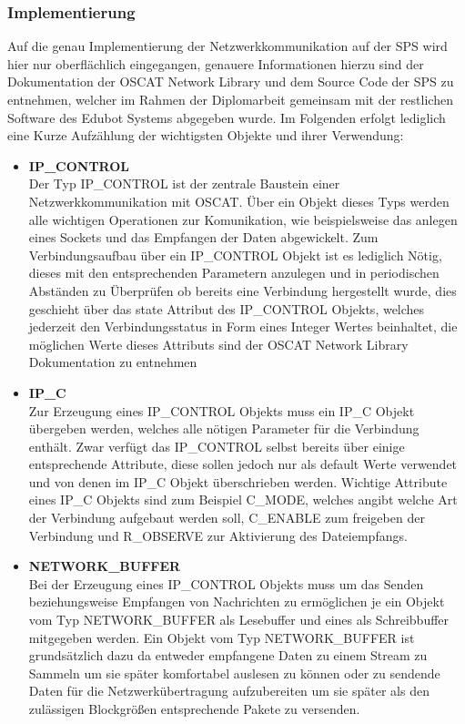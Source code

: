 \subsubsection{Implementierung}
Auf die genau Implementierung der Netzwerkkommunikation auf der SPS wird hier nur oberflächlich eingegangen, genauere Informationen hierzu sind der Dokumentation der OSCAT Network Library und dem Source Code der SPS zu entnehmen, welcher im Rahmen der Diplomarbeit gemeinsam mit der restlichen Software des Edubot Systems abgegeben wurde. Im Folgenden erfolgt lediglich eine Kurze Aufzählung der wichtigsten Objekte und ihrer Verwendung:
\begin{itemize}
\item \textbf{IP\_CONTROL}\\
Der Typ IP\_CONTROL ist der zentrale Baustein einer Netzwerkkommunikation mit OSCAT. Über ein Objekt dieses Typs werden alle wichtigen Operationen zur Komunikation, wie beispielsweise das anlegen eines Sockets und das Empfangen der Daten abgewickelt. Zum Verbindungsaufbau über ein IP\_CONTROL Objekt ist es lediglich Nötig, dieses mit den entsprechenden Parametern anzulegen und in periodischen Abständen zu Überprüfen ob bereits eine Verbindung hergestellt wurde, dies geschieht über das state Attribut des IP\_CONTROL Objekts, welches jederzeit den Verbindungsstatus in Form eines Integer Wertes beinhaltet, die möglichen Werte dieses Attributs sind der OSCAT Network Library Dokumentation zu entnehmen

\item \textbf{IP\_C}\\
Zur Erzeugung eines IP\_CONTROL Objekts muss ein IP\_C Objekt übergeben werden, welches alle nötigen Parameter für die Verbindung enthält. Zwar verfügt das IP\_CONTROL selbst bereits über einige entsprechende Attribute, diese sollen jedoch nur als default Werte verwendet und von denen im IP\_C Objekt überschrieben werden. 
Wichtige Attribute eines IP\_C Objekts sind zum Beispiel C\_MODE, welches angibt welche Art der Verbindung aufgebaut werden soll, C\_ENABLE zum freigeben der Verbindung und R\_OBSERVE zur Aktivierung des Dateiempfangs.

\item \textbf{NETWORK\_BUFFER}\\
Bei der Erzeugung eines IP\_CONTROL Objekts muss um das Senden beziehungsweise Empfangen von Nachrichten zu ermöglichen je ein Objekt vom Typ NETWORK\_BUFFER als Lesebuffer und eines als Schreibbuffer mitgegeben werden. Ein Objekt vom Typ NETWORK\_BUFFER ist grundsätzlich dazu da entweder empfangene Daten zu einem Stream zu Sammeln um sie später komfortabel auslesen zu können oder zu sendende Daten für die Netzwerkübertragung aufzubereiten um sie später als den zulässigen Blockgrößen entsprechende Pakete zu versenden.
\end{itemize}

